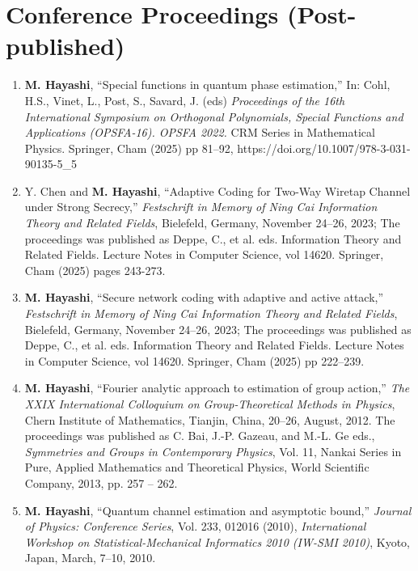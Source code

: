 \documentclass[a4paper,12pt,oneside]{article}
\begin{document}
\section{Conference Proceedings (Post-published)}
\begin{enumerate}
	\item
	\textbf{M. Hayashi}, 
	``Special functions in quantum phase estimation,''
	In: Cohl, H.S., Vinet, L., Post, S., Savard, J. (eds) {\em Proceedings of the 16th International Symposium on Orthogonal Polynomials, Special Functions and Applications (OPSFA-16). OPSFA 2022.} 
	CRM Series in Mathematical Physics. Springer, Cham (2025) 
	pp 81–92,
	https://doi.org/10.1007/978-3-031-90135-5\_5
	
	\item
	Y. Chen and \textbf{M. Hayashi},  ``Adaptive Coding for Two-Way Wiretap Channel under Strong Secrecy,''
	{\em Festschrift in Memory of Ning Cai
		Information Theory and Related Fields},
	Bielefeld, Germany, November 24--26, 2023; 
	The proceedings was published as 
	Deppe, C., et al. eds. 
	Information Theory and Related Fields. 
	Lecture Notes in Computer Science, vol 14620. 
	Springer, Cham (2025) pages 243-273.
	
	
	\item
	\textbf{M. Hayashi}, 
	``Secure network coding with adaptive and active attack,''
	{\em Festschrift in Memory of Ning Cai
		Information Theory and Related Fields},
	Bielefeld, Germany, November 24--26, 2023; 
	The proceedings was published as 
	Deppe, C., et al. eds. 
	Information Theory and Related Fields. 
	Lecture Notes in Computer Science, vol 14620. 
	Springer, Cham (2025) pp 222–239.
	

    \item
    \textbf{M. Hayashi}, ``Fourier analytic approach to estimation of group action,'' 
    {\em The XXIX International Colloquium on Group-Theoretical Methods in Physics}, 
    Chern Institute of Mathematics, Tianjin, China, 20--26, August, 2012.
    The proceedings was published as 
    C. Bai, J.-P. Gazeau, and M.-L. Ge eds.,
    {\em Symmetries and Groups in Contemporary Physics},
    Vol. 11, Nankai Series in Pure, Applied Mathematics and Theoretical Physics,
    World Scientific Company, 2013, pp. 257 -- 262.
    
    \item	\textbf{M. Hayashi}, 
    ``Quantum channel estimation and asymptotic bound,'' 
    {\em Journal of Physics: Conference Series}, Vol. 233, 012016 (2010), 
    {\em International Workshop on Statistical-Mechanical Informatics 2010 (IW-SMI 2010)}, 
    Kyoto, Japan, March, 7--10, 2010.


\end{enumerate}
\end{document}

